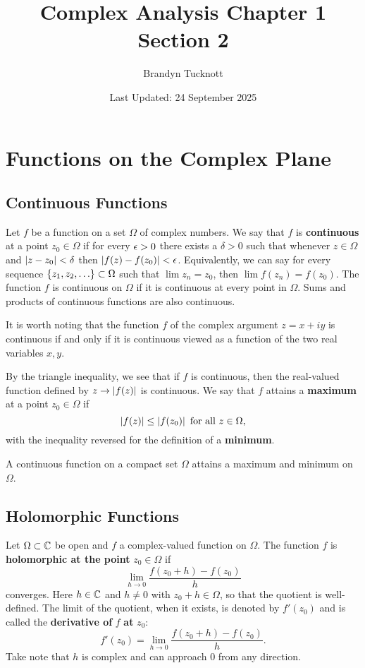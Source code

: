 \documentclass{exam}
\title{Complex Analysis Chapter 1 Section 2}
\author{Brandyn Tucknott}
\date{Last Updated: 24 September 2025}
\begin{document}
\maketitle

\section{Functions on the Complex Plane}
\subsection{Continuous Functions}
Let $f$ be a function on a set $\Omega$ of complex numbers. We say that $f$ is \textbf{continuous}
at a point $z_0\in\Omega$ if for every $\epsilon > 0$ there exists a $\delta > 0$ such that whenever
$z\in\Omega$ and $\left| z - z_0 \right| < \delta$ then $\left| f(z) - f(z_0) \right| < \epsilon$. Equivalently, we can 
say for every sequence $\left \{ z_1, z_2, \hdots \right \}\subset \Omega$ such that $\lim z_n = z_0$, then
$\lim f(z_n) = f(z_0)$. The function $f$ is continuous on $\Omega$ if it is continuous at every
point in $\Omega$. Sums and products of continuous functions are also continuous.

It is worth noting that the function $f$ of the complex argument $z = x + iy$ is continuous if and
only if it is continuous viewed as a function of the two real variables $x, y$.

By the triangle inequality, we see that if $f$ is continuous, then the real-valued function defined
by $z\to\left| f(z) \right|$ is continuous. We say that $f$ attains a \textbf{maximum} at a point $z_0\in\Omega$
if
$$\left| f(z) \right| \leq \left| f(z_0) \right|\text{ for all }z\in\Omega,$$
with the inequality reversed for the definition of a \textbf{minimum}.

\begin{theorem}\label{thm:main}
    A continuous function on a compact set $\Omega$ attains a maximum and minimum on $\Omega$.
\end{theorem}


\subsection{Holomorphic Functions}
Let $\Omega\subset\mathbb{C}$ be open and $f$ a complex-valued function on $\Omega$. The function $f$ is
\textbf{holomorphic at the point} $z_0\in\Omega$ if
$$\lim_{h\to 0}\frac{f(z_0 + h) - f(z_0)}{h}$$
converges. Here $h\in\mathbb{C}$ and $h\neq 0$ with $z_0 + h\in\Omega$, so that the quotient is well-defined.
The limit of the quotient, when it exists, is denoted by $f'(z_0)$ and is called the \textbf{derivative
of} $f$ \textbf{at} $z_0$:
$$f'(z_0) = \lim_{h\to 0}\frac{f(z_0 + h) - f(z_0)}{h}.$$
Take note that $h$ is complex and can approach $0$ from any direction.
\end{document}
